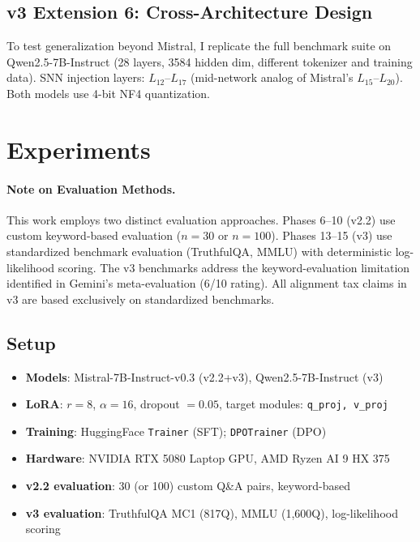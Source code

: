 \documentclass[11pt,a4paper]{article}
\begin{document}
\subsection{v3 Extension 6: Cross-Architecture Design}

To test generalization beyond Mistral, I replicate the full benchmark suite on Qwen2.5-7B-Instruct \cite{qwen2025} (28 layers, 3584 hidden dim, different tokenizer and training data). SNN injection layers: $L_{12}$--$L_{17}$ (mid-network analog of Mistral's $L_{15}$--$L_{20}$). Both models use 4-bit NF4 quantization.

\section{Experiments}

\paragraph{Note on Evaluation Methods.} This work employs two distinct evaluation approaches. Phases 6--10 (v2.2) use custom keyword-based evaluation ($n=30$ or $n=100$). Phases 13--15 (v3) use standardized benchmark evaluation (TruthfulQA, MMLU) with deterministic log-likelihood scoring. The v3 benchmarks address the keyword-evaluation limitation identified in Gemini's meta-evaluation (6/10 rating). All alignment tax claims in v3 are based exclusively on standardized benchmarks.

\subsection{Setup}
\begin{itemize}
    \item \textbf{Models}: Mistral-7B-Instruct-v0.3 (v2.2+v3), Qwen2.5-7B-Instruct (v3)
    \item \textbf{LoRA}: $r=8$, $\alpha=16$, dropout $= 0.05$, target modules: \texttt{q\_proj, v\_proj}
    \item \textbf{Training}: HuggingFace \texttt{Trainer} (SFT); \texttt{DPOTrainer} (DPO)
    \item \textbf{Hardware}: NVIDIA RTX 5080 Laptop GPU, AMD Ryzen AI 9 HX 375
    \item \textbf{v2.2 evaluation}: 30 (or 100) custom Q\&A pairs, keyword-based
    \item \textbf{v3 evaluation}: TruthfulQA MC1 (817Q), MMLU (1,600Q), log-likelihood scoring
\end{itemize}
\end{document}
